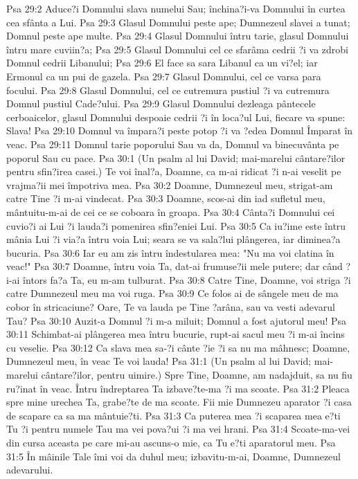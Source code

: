 Psa 29:2  Aduce?i Domnului slava numelui Sau; închina?i-va Domnului în curtea cea sfânta a Lui.
Psa 29:3  Glasul Domnului peste ape; Dumnezeul slavei a tunat; Domnul peste ape multe.
Psa 29:4  Glasul Domnului întru tarie, glasul Domnului întru mare cuviin?a;
Psa 29:5  Glasul Domnului cel ce sfarâma cedrii ?i va zdrobi Domnul cedrii Libanului;
Psa 29:6  El face sa sara Libanul ca un vi?el; iar Ermonul ca un pui de gazela.
Psa 29:7  Glasul Domnului, cel ce varsa para focului.
Psa 29:8  Glasul Domnului, cel ce cutremura pustiul ?i va cutremura Domnul pustiul Cade?ului.
Psa 29:9  Glasul Domnului dezleaga pântecele cerboaicelor, glasul Domnului despoaie cedrii ?i în loca?ul Lui, fiecare va spune: Slava!
Psa 29:10  Domnul va împara?i peste potop ?i va ?edea Domnul Împarat în veac.
Psa 29:11  Domnul tarie poporului Sau va da, Domnul va binecuvânta pe poporul Sau cu pace.
Psa 30:1  (Un psalm al lui David; mai-marelui cântare?ilor pentru sfin?irea casei.) Te voi înal?a, Doamne, ca m-ai ridicat ?i n-ai veselit pe vrajma?ii mei împotriva mea.
Psa 30:2  Doamne, Dumnezeul meu, strigat-am catre Tine ?i m-ai vindecat.
Psa 30:3  Doamne, scos-ai din iad sufletul meu, mântuitu-m-ai de cei ce se coboara în groapa.
Psa 30:4  Cânta?i Domnului cei cuvio?i ai Lui ?i lauda?i pomenirea sfin?eniei Lui.
Psa 30:5  Ca iu?ime este întru mânia Lui ?i via?a întru voia Lui; seara se va sala?lui plângerea, iar diminea?a bucuria.
Psa 30:6  Iar eu am zis întru îndestularea mea: "Nu ma voi clatina în veac!"
Psa 30:7  Doamne, întru voia Ta, dat-ai frumuse?ii mele putere; dar când ?i-ai întors fa?a Ta, eu m-am tulburat.
Psa 30:8  Catre Tine, Doamne, voi striga ?i catre Dumnezeul meu ma voi ruga.
Psa 30:9  Ce folos ai de sângele meu de ma cobor în stricaciune? Oare, Te va lauda pe Tine ?arâna, sau va vesti adevarul Tau?
Psa 30:10  Auzit-a Domnul ?i m-a miluit; Domnul a fost ajutorul meu!
Psa 30:11  Schimbat-ai plângerea mea întru bucurie, rupt-ai sacul meu ?i m-ai încins cu veselie.
Psa 30:12  Ca slava mea sa-?i cânte ?ie ?i sa nu ma mâhnesc; Doamne, Dumnezeul meu, în veac Te voi lauda!
Psa 31:1  (Un psalm al lui David; mai-marelui cântare?ilor, pentru uimire.) Spre Tine, Doamne, am nadajduit, sa nu fiu ru?inat în veac. Întru îndreptarea Ta izbave?te-ma ?i ma scoate.
Psa 31:2  Pleaca spre mine urechea Ta, grabe?te de ma scoate. Fii mie Dumnezeu aparator ?i casa de scapare ca sa ma mântuie?ti.
Psa 31:3  Ca puterea mea ?i scaparea mea e?ti Tu ?i pentru numele Tau ma vei pova?ui ?i ma vei hrani.
Psa 31:4  Scoate-ma-vei din cursa aceasta pe care mi-au ascuns-o mie, ca Tu e?ti aparatorul meu.
Psa 31:5  În mâinile Tale îmi voi da duhul meu; izbavitu-m-ai, Doamne, Dumnezeul adevarului.
